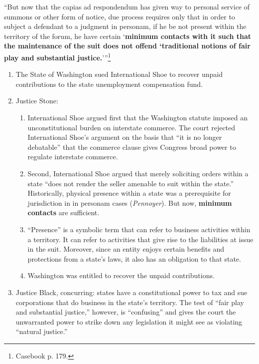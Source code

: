 \enquote{But now that the capias ad respondendum has given way to personal 
service of summons or other form of notice, due process requires only that in 
order to subject a defendant to a judgment in personam, if he be not present 
within the territory of the forum, he have certain \enquote{\textbf{minimum 
contacts with it such that the maintenance of the suit does not offend 
`traditional notions of fair play and substantial 
justice.}}}\footnote{Casebook p. 179.}
\begin{enumerate}
    \item The State of Washington sued International Shoe to recover unpaid 
    contributions to the state unemployment compensation fund.
    \item Justice Stone:
    \begin{enumerate}
        \item International Shoe argued first that the Washington statute 
        imposed an unconstitutional burden on interstate commerce. The court 
        rejected International Shoe's argument on the basis that ``it is no 
        longer debatable'' that the commerce clause gives Congress broad power 
        to regulate interstate commerce.
        \item Second, International Shoe argued that merely soliciting orders 
        within a state ``does not render the seller amenable to suit within 
        the state.'' Historically, physical presence within a state was a 
        prerequisite for jurisdiction in in personam cases (\emph{Pennoyer}).  
        But now, \textbf{minimum contacts} are sufficient.
        \item ``Presence'' is a symbolic term that can refer to business 
        activities within a territory.  It can refer to activities that give 
        rise to the liabilities at issue in the suit. Moreover, since an 
        entity enjoys certain benefits and protections from a state's laws, it 
        also has an obligation to that state.
        \item Washington was entitled to recover the unpaid contributions.
    \end{enumerate}
    \item Justice Black, concurring: states have a constitutional power to tax 
    and sue corporations that do business in the state's territory. The test 
    of ``fair play and substantial justice,'' however, is ``confusing'' and 
    gives the court the unwarranted power to strike down any legislation it 
    might see as violating ``natural justice.''
\end{enumerate}

